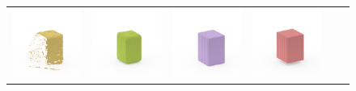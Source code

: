 \documentclass[10pt,twocolumn,letterpaper]{article}
\begin{document}
\begin{figure}
\begin{tabular}{cccccc}
\includegraphics[height=\turnheight, clip=true, trim=60 30 30 60]{data/renders_turn_table/pop_tarts_strawberry_NP3_0.mat_visible_pixels_view_90} &
\includegraphics[height=\turnheight, clip=true, trim=60 30 30 60]{data/renders_turn_table/pop_tarts_strawberry_NP3_0.mat_gt_view_90} &
\includegraphics[height=\turnheight, clip=true, trim=60 30 30 60]{data/renders_turn_table/pop_tarts_strawberry_NP3_0.mat_bb_view_90} &
\includegraphics[height=\turnheight, clip=true, trim=60 30 30 60]{data/renders_turn_table/pop_tarts_strawberry_NP3_0.mat_zheng_view_90} &

\end{tabular}
\end{figure}
\end{document}
